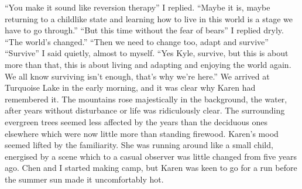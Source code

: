 \documentclass[a4paper]{article}
\begin{document}
“You make it sound like reversion therapy” I replied.
“Maybe it is, maybe returning to a childlike state and learning how to live in this world is a stage we have to go through.”
“But this time without the fear of bears” I replied dryly. “The world’s changed.”
“Then we need to change too, adapt and survive”
“Survive” I said quietly, almost to myself.
“Yes Kyle, survive, but this is about more than that, this is about living and adapting and enjoying the world again. We all know surviving isn’t enough, that’s why we’re here.”
We arrived at Turquoise Lake in the early morning, and it was clear why Karen had remembered it. The mountains rose majestically in the background, the water, after years without disturbance or life was ridiculously clear. The surrounding evergreen trees seemed less affected by the years than the deciduous ones elsewhere which were now little more than standing firewood. Karen’s mood seemed lifted by the familiarity. She was running around like a small child, energised by a scene which to a casual observer was little changed from five years ago. Chen and I started making camp, but Karen was keen to go for a run before the summer sun made it uncomfortably hot.
\end{document}
